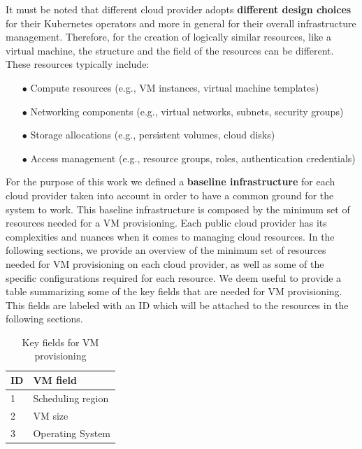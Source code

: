 It must be noted that different cloud provider adopts \textbf{different design choices} for their Kubernetes operators and more in general for their overall infrastructure management. Therefore, for the creation of logically similar resources, like a virtual machine, the structure and the field of the resources can be different. 
These resources typically include:
\begin{itemize}[itemsep=0.2pt, topsep=1pt]
  \item[$\bullet$] Compute resources (e.g., VM instances, virtual machine templates)
  \item[$\bullet$] Networking components (e.g., virtual networks, subnets, security groups)
  \item[$\bullet$] Storage allocations (e.g., persistent volumes, cloud disks)
  \item[$\bullet$] Access management (e.g., resource groups, roles, authentication credentials)
\end{itemize}

For the purpose of this work we defined a \textbf{baseline infrastructure} for each cloud provider taken into account in order to have a common ground for the system to work. 
This baseline infrastructure is composed by the minimum set of resources needed for a VM provisioning.
Each public cloud provider has its complexities and nuances when it comes to managing cloud resources.
In the following sections, we provide an overview of the minimum set of resources needed for VM provisioning on each cloud provider, as well as some of the specific configurations required for each resource.
We deem useful to provide a table summarizing some of the key fields that are needed for VM provisioning.
This fields are labeled with an ID which will be attached to the resources in the following sections.

\begin{table}[H]
  \centering
  \begin{tabular}{|l|l|}
  \hline
  \textbf{ID} & \textbf{VM field} \\ \hline
  1           & Scheduling region \\ \hline
  2           & VM size           \\ \hline
  3           & Operating System           \\ \hline
  \end{tabular}
  \caption{Key fields for VM provisioning}
  \label{tab:vm_fields}
\end{table}


